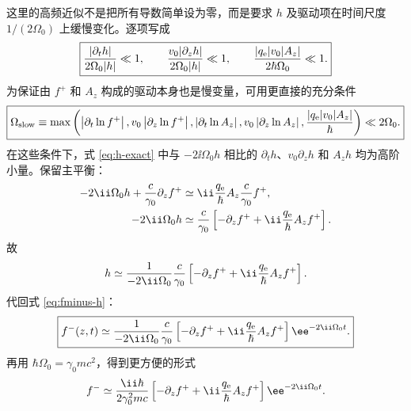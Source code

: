 这里的高频近似不是把所有导数简单设为零，而是要求 $h$ 及驱动项在时间尺度 $1/(2\Omega_0)$ 上缓慢变化。逐项写成
\begin{equation}
 \boxed{
 \frac{|\partial_t h|}{2\Omega_0|h|}\ll1,
 \qquad
 \frac{v_0|\partial_z h|}{2\Omega_0|h|}\ll1,
 \qquad
 \frac{|q_{\rm e}|v_0|A_z|}{2\hbar\Omega_0}\ll1.}
 \label{eq:HFconditions-h}
\end{equation}
为保证由 $f^+$ 和 $A_z$ 构成的驱动本身也是慢变量，可用更直接的充分条件
\begin{equation}
 \boxed{
 \Omega_{\rm slow}
 \equiv
 \max\left(
 \left|\partial_t\ln f^+\right|,
 v_0\left|\partial_z\ln f^+\right|,
 \left|\partial_t\ln A_z\right|,
 v_0\left|\partial_z\ln A_z\right|,
 \frac{|q_{\rm e}|v_0|A_z|}{\hbar}
 \right)
 \ll2\Omega_0.}
 \label{eq:HFcondition-compact}
\end{equation}
在这些条件下，式 \eqref{eq:h-exact} 中与 $-2\ii\Omega_0h$ 相比的 $\partial_th$、$v_0\partial_zh$ 和 $A_zh$ 均为高阶小量。保留主平衡：
\begin{align}
 -2\ii\Omega_0h
 +\frac{c}{\gamma_0}\partial_z f^+
 &\simeq
 \ii\frac{q_{\rm e}}{\hbar}A_z\frac{c}{\gamma_0}f^+,\\
 -2\ii\Omega_0h
 &\simeq
 \frac{c}{\gamma_0}
 \left[-\partial_z f^+
 +\ii\frac{q_{\rm e}}{\hbar}A_zf^+\right].
\end{align}
故
\begin{equation}
 h\simeq
 \frac{1}{-2\ii\Omega_0}\frac{c}{\gamma_0}
 \left[-\partial_z f^+
 +\ii\frac{q_{\rm e}}{\hbar}A_zf^+\right].
\end{equation}
代回式 \eqref{eq:fminus-h}：
\begin{equation}
 \boxed{
 f^-(z,t)\simeq
 \frac{1}{-2\ii\Omega_0}\frac{c}{\gamma_0}
 \left[-\partial_z f^+
 +\ii\frac{q_{\rm e}}{\hbar}A_zf^+\right]
 \ee^{-2\ii\Omega_0t}.}
 \label{eq:fminus-approx}
\end{equation}
再用 $\hbar\Omega_0=\gamma_0mc^2$，得到更方便的形式
\begin{equation}
 f^-\simeq
 \frac{\ii\hbar}{2\gamma_0^2mc}
 \left[-\partial_z f^+
 +\ii\frac{q_{\rm e}}{\hbar}A_zf^+\right]
 \ee^{-2\ii\Omega_0t}.
 \label{eq:fminus-approx2}
\end{equation}

